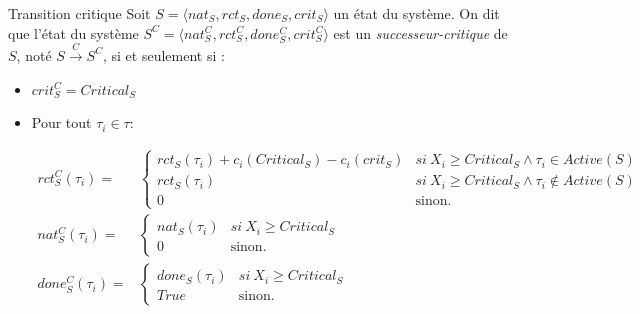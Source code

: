 \documentclass{bredelebeamer}
\begin{document}
\begin{frame}{Transition critique}
Soit $S = \langle nat_S, rct_S, done_S, crit_S \rangle$ un état du système. On dit que l'état du système $S^C = \langle nat_S^C, rct_S^C, done_S^C, crit_S^C \rangle$ est un \textit{successeur-critique} de $S$, noté $S\xrightarrow{C}S^C$, si et seulement si :

\begin{itemize}
\item $crit_S^C = Critical_S$
\item Pour tout $\tau_i \in \tau :$

\noindent $$
\begin{array}{rl}
rct_S^C(\tau_i) =  &\left\{
    \begin{array}{ll}
        rct_S(\tau_i)+c_i(Critical_S)-c_i(crit_S) & si\ X_i\geq Critical_S \wedge \tau_i \in Active(S)\\
        rct_S(\tau_i) & si\ X_i\geq Critical_S \wedge \tau_i \notin Active(S)\\
        0 & \mbox{sinon.}
    \end{array}
\right.\\
 nat_S^C(\tau_i) = &\left\{
    \begin{array}{ll}
        nat_S(\tau_i) & si\ X_i\geq Critical_S \\
        0 & \mbox{sinon.}
    \end{array}
\right.\\
 done_S^C(\tau_i) = &\left\{
    \begin{array}{ll}
        done_S(\tau_i) & si\ X_i\geq Critical_S \\
        True & \mbox{sinon.}
    \end{array}
\right.
\end{array}
$$
\end{itemize}
\end{frame}
\end{document}
